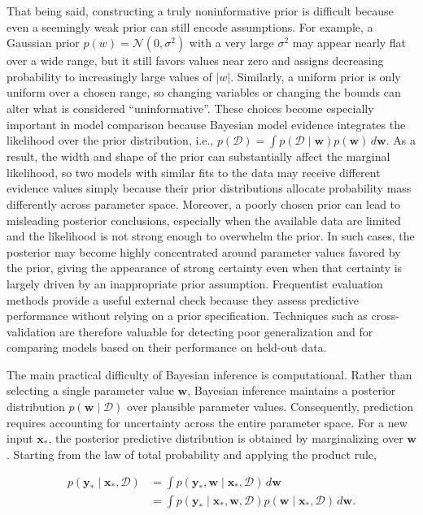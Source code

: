 \documentclass[10pt,twocolumn]{memoir}
\begin{document}
That being said, constructing a truly noninformative prior is difficult because even a seemingly weak prior can still encode assumptions. For example, a Gaussian prior $p(w)=\mathcal{N}(0,\sigma^2)$ with a very large $\sigma^2$ may appear nearly flat over a wide range, but it still favors values near zero and assigns decreasing probability to increasingly large values of $|w|$. Similarly, a uniform prior is only uniform over a chosen range, so changing variables or changing the bounds can alter what is considered ``uninformative''. These choices become especially important in model comparison because Bayesian model evidence integrates the likelihood over the prior distribution, i.e., $p(\mathcal{D}) = \int p(\mathcal{D}\mid \mathbf{w})p(\mathbf{w})\,d\mathbf{w}$. As a result, the width and shape of the prior can substantially affect the marginal likelihood, so two models with similar fits to the data may receive different evidence values simply because their prior distributions allocate probability mass differently across parameter space. Moreover, a poorly chosen prior can lead to misleading posterior conclusions, especially when the available data are limited and the likelihood is not strong enough to overwhelm the prior. In such cases, the posterior may become highly concentrated around parameter values favored by the prior, giving the appearance of strong certainty even when that certainty is largely driven by an inappropriate prior assumption. Frequentist evaluation methods provide a useful external check because they assess predictive performance without relying on a prior specification. Techniques such as cross-validation are therefore valuable for detecting poor generalization and for comparing models based on their performance on held-out data.

The main practical difficulty of Bayesian inference is computational. Rather than selecting a single parameter value $\mathbf{w}$, Bayesian inference maintains a posterior distribution $p(\mathbf{w}\mid\mathcal{D})$ over plausible parameter values. Consequently, prediction requires accounting for uncertainty across the entire parameter space. For a new input $\mathbf{x}_*$, the posterior predictive distribution is obtained by marginalizing over $\mathbf{w}$. Starting from the law of total probability and applying the product rule,

\begin{equation}
\begin{aligned}
p(\mathbf{y}_*\mid\mathbf{x}_*,\mathcal{D})
&=
\int p(\mathbf{y}_*,\mathbf{w}\mid\mathbf{x}_*,\mathcal{D})\,d\mathbf{w} \\
&=
\int
p(\mathbf{y}_*\mid\mathbf{x}_*,\mathbf{w},\mathcal{D})p(\mathbf{w}\mid\mathbf{x}_*,\mathcal{D})\,d\mathbf{w}.
\end{aligned}
\label{eq:c1_bayes_inference}
\end{equation}
\end{document}
